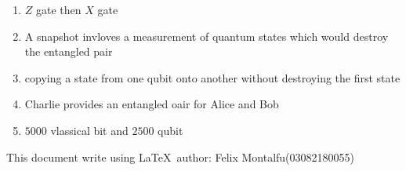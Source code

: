 \documentclass[a4paper]{article}
\begin{document}
    \begin{enumerate}[1.]
        \item $Z$ gate then $X$ gate
        \item A snapshot invloves a measurement of quantum states which would destroy the entangled pair
        \item copying a state from one qubit onto another without destroying the first state
        \item Charlie provides an entangled oair for Alice and Bob
        \item $5000$ vlassical bit and $2500$ qubit
    \end{enumerate}
    This document write using \LaTeX \ author: Felix Montalfu(03082180055)
\end{document}
